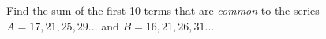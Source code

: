 
%
%
%
%
% 
% 

\question Find the sum of the first 10 terms that are \textit{common} to the series 
$A = 17,21,25,29 ...$ and $B = 16,21,26,31 ...$

\insertQR{}

\ifprintanswers
\fi 

